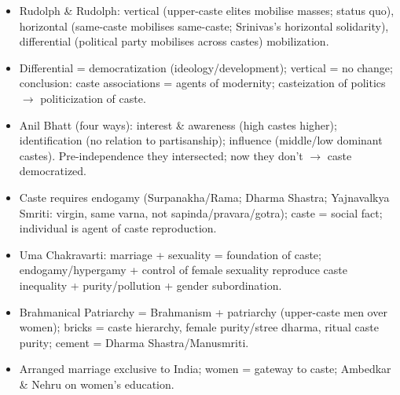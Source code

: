 \begin{QuickRevision}
\begin{itemize}
\item Rudolph \& Rudolph: vertical (upper-caste elites mobilise masses; status quo), horizontal (same-caste mobilises same-caste; Srinivas's horizontal solidarity), differential (political party mobilises across castes) mobilization.
\item Differential = democratization (ideology/development); vertical = no change; conclusion: caste associations = agents of modernity; casteization of politics $\rightarrow$ politicization of caste.
\item Anil Bhatt (four ways): interest \& awareness (high castes higher); identification (no relation to partisanship); influence (middle/low dominant castes). Pre-independence they intersected; now they don't $\rightarrow$ caste democratized.
\item Caste requires endogamy (Surpanakha/Rama; Dharma Shastra; Yajnavalkya Smriti: virgin, same varna, not sapinda/pravara/gotra); caste = social fact; individual is agent of caste reproduction.
\item Uma Chakravarti: marriage + sexuality = foundation of caste; endogamy/hypergamy + control of female sexuality reproduce caste inequality + purity/pollution + gender subordination.
\item Brahmanical Patriarchy = Brahmanism + patriarchy (upper-caste men over women); bricks = caste hierarchy, female purity/stree dharma, ritual caste purity; cement = Dharma Shastra/Manusmriti.
\item Arranged marriage exclusive to India; women = gateway to caste; Ambedkar \& Nehru on women's education.
\end{itemize}
\end{QuickRevision}

